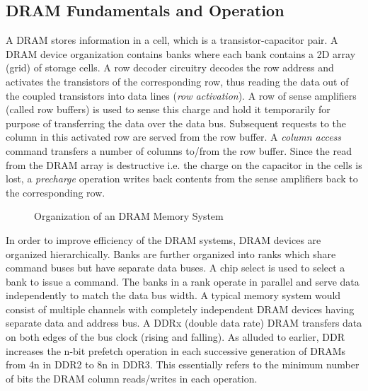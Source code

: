 \subsection{DRAM Fundamentals and Operation}
A DRAM stores information in a cell, which is a transistor-capacitor pair. A DRAM device organization contains banks where each bank contains a 2D array (grid) of storage cells. A row decoder circuitry decodes the row address and activates the transistors of the corresponding row, thus reading the data out of the coupled transistors into data lines (\textit{row activation}). A row of sense amplifiers (called row buffers) is used to sense this charge and hold it temporarily for purpose of transferring the data over the data bus. Subsequent requests to the column in this activated row are served from the row buffer. A \textit{column access} command transfers a number of columns to/from the row buffer. Since the read from the DRAM array is destructive i.e. the charge on the capacitor in the cells is lost, a \textit{precharge} operation writes back contents from the sense amplifiers back to the corresponding row.
\begin{figure}[!htb]
	\centering
	\def\svgwidth{\columnwidth}
	
	\caption{Organization of an DRAM Memory System}
	\label{fig:dram-basics}
\end{figure}
\par In order to improve efficiency of the DRAM systems, DRAM devices are organized hierarchically. Banks are further organized into ranks which share command buses but have separate data buses. A chip select is used to select a bank to issue a command.  The banks in a rank operate in parallel and serve data independently to match the data bus width. A typical memory system would consist of multiple channels with completely independent DRAM devices having separate data and address bus. A DDRx (double data rate) DRAM transfers data on both edges of the bus clock (rising and falling). As alluded to earlier, DDR increases the n-bit prefetch operation in each successive generation of DRAMs from 4n in DDR2 to 8n in DDR3. This essentially refers to the minimum number of bits the DRAM column reads/writes in each operation.
